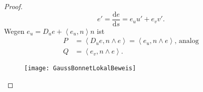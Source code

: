 \begin{theorem}
\begin{proof}
    \begin{minipage}{.6\textwidth}
      \begin{equation*}
        e' = \frac{\text{d}e}{\text{d}s} = e_u u' + e_v v'\text{.}
      \end{equation*}
      Wegen \( e_u = D_u e + \left\langle e_u,n \right\rangle n \) ist
      \begin{align*}
        P &= \left\langle D_u e, n \wedge e \right\rangle = \left\langle e_u, n \wedge e \right\rangle\text{, analog} \\
        Q &= \left\langle e_v, n \wedge e \right\rangle\text{.}
      \end{align*}
    \end{minipage}
    \hfill
    \begin{minipage}{.375\textwidth}
      \begin{figure}[H]
        \texttt{[image: GaussBonnetLokalBeweis]}
      \end{figure}
      \vspace*{0.5em}
    \end{minipage}


\end{proof}
\end{theorem}
